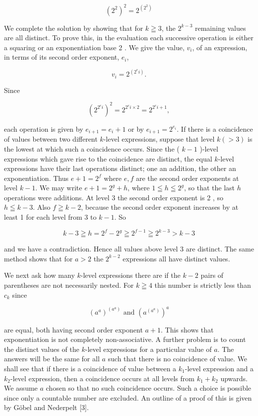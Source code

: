 \documentclass[10pt]{article}
\begin{document}
$$
\left(2^{2}\right)^{2}=2^{\left(2^{2}\right)}
$$

We complete the solution by showing that for $k \geqq 3$, the $2^{k-3}$ remaining values are all distinct. To prove this, in the evaluation each successive operation is either a squaring or an exponentiation base 2 . We give the value, $v_{i}$, of an expression, in terms of its second order exponent, $e_{i}$,

$$
v_{i}=2^{\left(2^{e} i\right)} .
$$

Since

$$
\left(2^{2^{e} i}\right)^{2}=2^{2^{e} i \times 2}=2^{2^{e} i+1},
$$

each operation is given by $e_{i+1}=e_{i}+1$ or by $e_{i+1}=2^{e_{i}}$. If there is a coincidence of values between two different $k$-level expressions, suppose that level $k(>3)$ is the lowest at which such a coincidence occurs. Since the ( $k-1$ )-level expressions which gave rise to the coincidence are distinct, the equal $k$-level expressions have their last operations distinct; one an addition, the other an exponentiation. Thus $e+1=2^{f}$ where $e, f$ are the second order exponents at level $k-1$. We may write $e+1=2^{g}+h$, where $1 \leqq h \leqq 2^{g}$, so that the last $h$ operations were additions. At level 3 the second order exponent is 2 , so $h \leqq k-3$. Also $f \geqq k-2$, because the second order exponent increases by at least 1 for each level from 3 to $k-1$. So

$$
k-3 \geqq h=2^{f}-2^{g} \geqq 2^{f-1} \geqq 2^{k-3}>k-3
$$

and we have a contradiction. Hence all values above level 3 are distinct. The same method shows that for $a>2$ the $2^{k-2}$ expressions all have distinct values.

We next ask how many $k$-level expressions there are if the $k-2$ pairs of parentheses are not necessarily nested. For $k \geqq 4$ this number is strictly less than $c_{k}$ since

$$
\left(a^{a}\right)^{\left(a^{a}\right)} \text { and }\left(a^{\left(a^{a}\right)}\right)^{a}
$$

are equal, both having second order exponent $a+1$. This shows that exponentiation is not completely non-associative. A further problem is to count the distinct values of the $k$-level expressions for a particular value of $a$. The answers will be the same for all $a$ such that there is no coincidence of value. We shall see that if there is a coincidence of value between a $k_{1}$-level expression and a $k_{2}$-level expression, then a coincidence occurs at all levels from $k_{1}+k_{2}$ upwards. We assume $a$ chosen so that no such coincidence occurs. Such a choice is possible since only a countable number are excluded. An outline of a proof of this is given by Göbel and Nederpelt [3].
\end{document}
